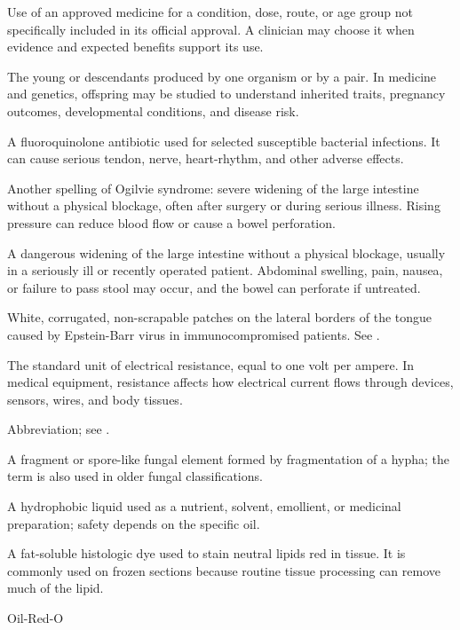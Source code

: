  Use of an approved medicine for a condition, dose, route, or age group not specifically included in its official approval. A clinician may choose it when evidence and expected benefits support its use.

 The young or descendants produced by one organism or by a pair. In medicine and genetics, offspring may be studied to understand inherited traits, pregnancy outcomes, developmental conditions, and disease risk.

 A fluoroquinolone antibiotic used for selected susceptible bacterial infections. It can cause serious tendon, nerve, heart-rhythm, and other adverse effects.

 Another spelling of Ogilvie syndrome: severe widening of the large intestine without a physical blockage, often after surgery or during serious illness. Rising pressure can reduce blood flow or cause a bowel perforation.

 A dangerous widening of the large intestine without a physical blockage, usually in a seriously ill or recently operated patient. Abdominal swelling, pain, nausea, or failure to pass stool may occur, and the bowel can perforate if untreated.

 White, corrugated, non-scrapable patches on the lateral borders of the tongue caused by Epstein-Barr virus in immunocompromised patients. See .

 The standard unit of electrical resistance, equal to one volt per ampere. In medical equipment, resistance affects how electrical current flows through devices, sensors, wires, and body tissues.

 Abbreviation; see .

 A fragment or spore-like fungal element formed by fragmentation of a hypha; the term is also used in older fungal classifications.

 A hydrophobic liquid used as a nutrient, solvent, emollient, or medicinal preparation; safety depends on the specific oil.

 A fat-soluble histologic dye used to stain neutral lipids red in tissue. It is commonly used on frozen sections because routine tissue processing can remove much of the lipid.

\synonyms
Oil-Red-O

